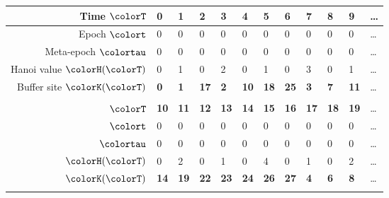 \begin{figure}[htbp!]
  \centering

\begin{minipage}{\linewidth}
  \footnotesize
  \setlength{\tabcolsep}{2.5pt}
  \begin{tabularx}{\linewidth}{@{}r|*{11}{Y}@{}}

  { Time $\colorT$} &
    \textbf{0} & \textbf{1} & \textbf{2} & \textbf{3} & \textbf{4}
    & \textbf{5} & \textbf{6} & \textbf{7} & \textbf{8} & \textbf{9} & \ldots \\ \hline
  { Epoch $\colort$} &
    0 & 0 & 0 & 0 & 0 & 0 & 0 & 0 & 0 & 0 & \ldots \\
  { Meta-epoch $\colortau$} &
    0 & 0 & 0 & 0 & 0 & 0 & 0 & 0 & 0 & 0 & \ldots \\
  { \footnotesize Hanoi value $\colorH(\colorT)$} &
    0 & 1 & 0 & 2 & 0 & 1 & 0 & 3 & 0 & 1 & \ldots \\
  { \footnotesize Buffer site $\colorK(\colorT)$} &
    \textbf{0} & \textbf{1} & \textbf{17} & \textbf{2} & \textbf{10}
    & \textbf{18} & \textbf{25} & \textbf{3} & \textbf{7} & \textbf{11} & \ldots \\
   \\[1ex]

  { $\colorT$} &
    \textbf{10} & \textbf{11} & \textbf{12} & \textbf{13} & \textbf{14}
    & \textbf{15} & \textbf{16} & \textbf{17} & \textbf{18} & \textbf{19} & \ldots \\ \hline
  { $\colort$} &
    0 & 0 & 0 & 0 & 0 & 0 & 0 & 0 & 0 & 0 & \ldots \\
  { $\colortau$} &
    0 & 0 & 0 & 0 & 0 & 0 & 0 & 0 & 0 & 0 & \ldots \\
  { $\colorH(\colorT)$} &
    0 & 2 & 0 & 1 & 0 & 4 & 0 & 1 & 0 & 2 & \ldots \\
  { $\colorK(\colorT)$} &
    \textbf{14} & \textbf{19} & \textbf{22} & \textbf{23} & \textbf{24}
    & \textbf{26} & \textbf{27} & \textbf{4} & \textbf{6} & \textbf{8} & \ldots \\
   \\[1ex]


\end{tabularx}
\end{minipage}
\end{figure}
